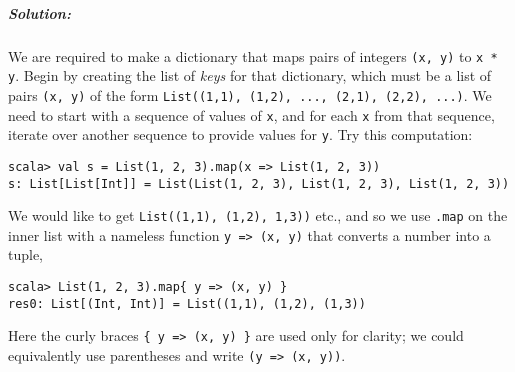 \subparagraph{Solution: }

We are required to make a dictionary that maps pairs of integers \lstinline!(x, y)!
to \lstinline!x * y!. Begin
by creating the list of \emph{keys} for that dictionary, which must
be a list of pairs \lstinline!(x, y)!
of the form \lstinline!List((1,1), (1,2), ..., (2,1), (2,2), ...)!.
We need to start with a sequence of values of \lstinline!x!,
and for each \lstinline!x!
from that sequence, iterate over another sequence to provide values
for \lstinline!y!. Try
this computation:
\begin{lstlisting}
scala> val s = List(1, 2, 3).map(x => List(1, 2, 3))
s: List[List[Int]] = List(List(1, 2, 3), List(1, 2, 3), List(1, 2, 3))
\end{lstlisting}
We would like to get \lstinline!List((1,1), (1,2), 1,3))!
etc., and so we use \lstinline!.map!
on the inner list with a nameless function \lstinline!y => (x, y)!
that converts a number into a tuple,
\begin{lstlisting}
scala> List(1, 2, 3).map{ y => (x, y) }
res0: List[(Int, Int)] = List((1,1), (1,2), (1,3))
\end{lstlisting}
Here the curly braces \lstinline!{ y => (x, y) }!
are used only for clarity; we could equivalently use parentheses and
write \lstinline!(y => (x, y))!. 

